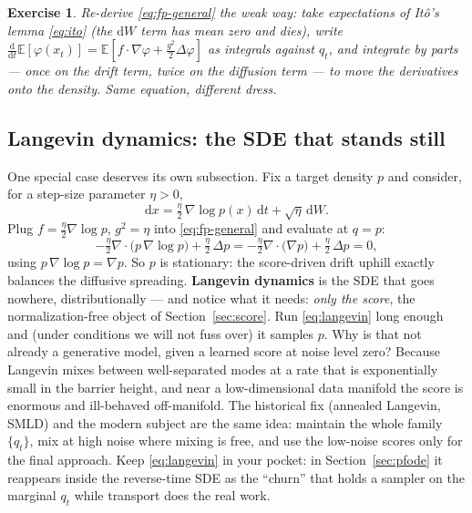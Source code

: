 \documentclass[10pt,a4paper]{article}
\newtheorem{exercise}{Exercise}
\newcommand{\E}{\mathbb{E}}
\newcommand{\dd}{\mathrm{d}}
\begin{document}
\begin{exercise}
Re-derive \eqref{eq:fp-general} the weak way: take expectations of
It\^o's lemma \eqref{eq:ito} (the $\dd W$ term has mean zero and dies),
write $\tfrac{\dd}{\dd t}\E[\varphi(x_t)]
= \E[f \cdot \nabla\varphi + \tfrac{g^2}{2}\Delta\varphi]$ as integrals
against $q_t$, and integrate by parts --- once on the drift term, twice
on the diffusion term --- to move the derivatives onto the density.
Same equation, different dress.
\end{exercise}

\subsection{Langevin dynamics: the SDE that stands still}
\label{sec:langevin}

One special case deserves its own subsection. Fix a target density $p$
and consider, for a step-size parameter $\eta > 0$,
\begin{equation}
\dd x = \tfrac{\eta}{2}\, \nabla \log p(x)\, \dd t + \sqrt{\eta}\, \dd W .
\label{eq:langevin}
\end{equation}
Plug $f = \tfrac{\eta}{2}\nabla\log p$, $g^2 = \eta$ into
\eqref{eq:fp-general} and evaluate at $q = p$:
\begin{equation}
-\tfrac{\eta}{2} \nabla\!\cdot\!\big( p\, \nabla\log p \big)
+ \tfrac{\eta}{2}\, \Delta p
= -\tfrac{\eta}{2} \nabla\!\cdot\!\big( \nabla p \big)
+ \tfrac{\eta}{2}\, \Delta p = 0 ,
\end{equation}
using $p\,\nabla\log p = \nabla p$. So $p$ is stationary: the
score-driven drift uphill exactly balances the diffusive spreading.
\textbf{Langevin dynamics} is the SDE that goes nowhere, distributionally
--- and notice what it needs: \emph{only the score}, the
normalization-free object of Section~\ref{sec:score}. Run
\eqref{eq:langevin} long enough and (under conditions we will not fuss
over) it samples $p$. Why is that not already a generative model, given a
learned score at noise level zero? Because Langevin mixes between
well-separated modes at a rate that is exponentially small in the barrier
height, and near a low-dimensional data manifold the score is enormous
and ill-behaved off-manifold. The historical fix (annealed Langevin,
SMLD) and the modern subject are the same idea: maintain the whole family
$\{q_t\}$, mix at high noise where mixing is free, and use the
low-noise scores only for the final approach. Keep \eqref{eq:langevin}
in your pocket: in Section~\ref{sec:pfode} it reappears inside the
reverse-time SDE as the ``churn'' that holds a sampler on the marginal
$q_t$ while transport does the real work.
\end{document}
